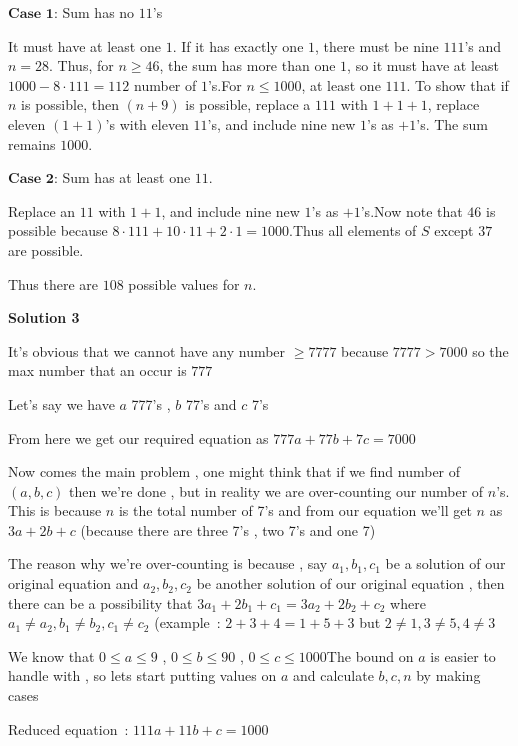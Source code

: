 \begin{enumerate}
 $\textbf{Case 1:}$ Sum has no $11$'s

 It must have at least one $1$. If it has exactly one $1$, there must be nine $111$’s and $n = 28$. Thus, for $n \geq 46$, the sum has more than one $1$, so it must have at least $1000 - 8 \cdot 111 = 112$ number of $1$’s.For $n \leq 1000$, at least one $111$. To show that if $n$ is possible, then $(n + 9)$ is possible, replace a $111$ with $1 + 1 + 1$, replace eleven $(1 + 1)$’s with eleven $11$’s, and include nine new $1$’s as $+1$’s. The sum remains $1000$.

 $\textbf{Case 2:}$ Sum has at least one $11$.

 Replace an $11$ with $1 + 1$, and include nine new $1$’s as $+1$’s.Now note that $46$ is possible because $8 \cdot 111 + 10 \cdot 11 + 2 \cdot 1 = 1000$.Thus all elements of $S$ except $37$ are possible. 

 Thus there are $\boxed{108}$ possible values for $n$.

 



\textbf{Solution 3}

It's obvious that we cannot have any number $\ge 7777$ because $7777 > 7000$ so the max number that an occur is $777$

 Let's say we have $a$  777's , $b$  77's and $c$  7's

 From here we get our required equation as $777a + 77b + 7c = 7000$

 Now comes the main problem , one might think that if we find number of $(a,b,c)$ then we're done , but in reality we are over-counting our number of $n$'s. This is because $n$ is the total number of 7's and from our equation we'll get $n$ as $3a + 2b + c$ (because there are three 7's , two 7's and one 7) 

 The reason why we're over-counting is because , say $a_1 , b_1 , c_1$ be a solution of our original equation and $a_2 , b_2 , c_2$ be another solution of our original equation , then there can be a possibility that $3a_1 + 2b_1 + c_1 = 3a_2 + 2b_2 + c_2$ where $a_1 \neq a_2 , b_1 \neq b_2 , c_1 \neq c_2$ (example : $2 + 3 + 4 = 1 + 5 + 3$ but $2 \neq 1 , 3 \neq 5 , 4 \neq 3$

 We know that $0 \le a \le 9$ , $0 \le b \le 90$ , $0 \le c \le 1000$The bound on $a$ is easier to handle with , so lets start putting values on $a$ and calculate $b , c , n$ by making cases

 Reduced equation : $111a + 11b + c = 1000$


\end{enumerate}
